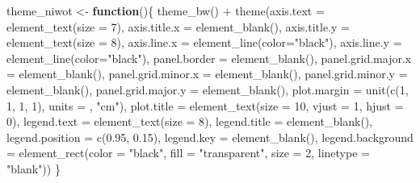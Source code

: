 \documentclass[a4paper,nobind]{templates/ociamthesis}
\newenvironment{Shaded}{\begin{snugshade}}{\end{snugshade}}
\newcommand{\AttributeTok}[1]{\textcolor[rgb]{0.77,0.63,0.00}{#1}}
\newcommand{\ControlFlowTok}[1]{\textcolor[rgb]{0.13,0.29,0.53}{\textbf{#1}}}
\newcommand{\DecValTok}[1]{\textcolor[rgb]{0.00,0.00,0.81}{#1}}
\newcommand{\FloatTok}[1]{\textcolor[rgb]{0.00,0.00,0.81}{#1}}
\newcommand{\FunctionTok}[1]{\textcolor[rgb]{0.00,0.00,0.00}{#1}}
\newcommand{\NormalTok}[1]{#1}
\newcommand{\OtherTok}[1]{\textcolor[rgb]{0.56,0.35,0.01}{#1}}
\newcommand{\SpecialCharTok}[1]{\textcolor[rgb]{0.00,0.00,0.00}{#1}}
\newcommand{\StringTok}[1]{\textcolor[rgb]{0.31,0.60,0.02}{#1}}
\renewenvironment{Shaded}
{
  \vspace{10pt}%
  \begin{snugshade}%
}{%
  \end{snugshade}%
  \vspace{8pt}%
}
\begin{document}
\begin{landscape}
\begin{Shaded}
\begin{Highlighting}[]
\NormalTok{theme\_niwot }\OtherTok{\textless{}{-}} \ControlFlowTok{function}\NormalTok{()\{}
  \FunctionTok{theme\_bw}\NormalTok{() }\SpecialCharTok{+}
    \FunctionTok{theme}\NormalTok{(}\AttributeTok{axis.text =} \FunctionTok{element\_text}\NormalTok{(}\AttributeTok{size =} \DecValTok{7}\NormalTok{), }
          \AttributeTok{axis.title.x =} \FunctionTok{element\_blank}\NormalTok{(),}
          \AttributeTok{axis.title.y =} \FunctionTok{element\_text}\NormalTok{(}\AttributeTok{size =} \DecValTok{8}\NormalTok{),}
          \AttributeTok{axis.line.x =} \FunctionTok{element\_line}\NormalTok{(}\AttributeTok{color=}\StringTok{"black"}\NormalTok{), }
          \AttributeTok{axis.line.y =} \FunctionTok{element\_line}\NormalTok{(}\AttributeTok{color=}\StringTok{"black"}\NormalTok{),}
          \AttributeTok{panel.border =} \FunctionTok{element\_blank}\NormalTok{(),}
          \AttributeTok{panel.grid.major.x =} \FunctionTok{element\_blank}\NormalTok{(),                                          }
          \AttributeTok{panel.grid.minor.x =} \FunctionTok{element\_blank}\NormalTok{(),}
          \AttributeTok{panel.grid.minor.y =} \FunctionTok{element\_blank}\NormalTok{(),}
          \AttributeTok{panel.grid.major.y =} \FunctionTok{element\_blank}\NormalTok{(),  }
          \AttributeTok{plot.margin =} \FunctionTok{unit}\NormalTok{(}\FunctionTok{c}\NormalTok{(}\DecValTok{1}\NormalTok{, }\DecValTok{1}\NormalTok{, }\DecValTok{1}\NormalTok{, }\DecValTok{1}\NormalTok{), }\AttributeTok{units =}\NormalTok{ , }\StringTok{"cm"}\NormalTok{),}
          \AttributeTok{plot.title =} \FunctionTok{element\_text}\NormalTok{(}\AttributeTok{size =} \DecValTok{10}\NormalTok{, }\AttributeTok{vjust =} \DecValTok{1}\NormalTok{, }\AttributeTok{hjust =} \DecValTok{0}\NormalTok{),}
          \AttributeTok{legend.text =} \FunctionTok{element\_text}\NormalTok{(}\AttributeTok{size =} \DecValTok{8}\NormalTok{),          }
          \AttributeTok{legend.title =} \FunctionTok{element\_blank}\NormalTok{(),                              }
          \AttributeTok{legend.position =} \FunctionTok{c}\NormalTok{(}\FloatTok{0.95}\NormalTok{, }\FloatTok{0.15}\NormalTok{), }
          \AttributeTok{legend.key =} \FunctionTok{element\_blank}\NormalTok{(),}
          \AttributeTok{legend.background =} \FunctionTok{element\_rect}\NormalTok{(}\AttributeTok{color =} \StringTok{"black"}\NormalTok{, }
                                           \AttributeTok{fill =} \StringTok{"transparent"}\NormalTok{, }
                                           \AttributeTok{size =} \DecValTok{2}\NormalTok{, }\AttributeTok{linetype =} \StringTok{"blank"}\NormalTok{))}
\NormalTok{\}}
\end{Highlighting}
\end{Shaded}


\end{landscape}
\end{document}
